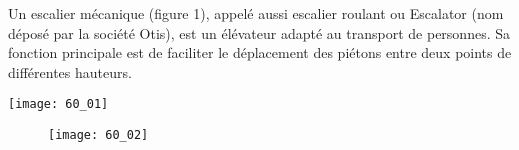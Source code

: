 \normaltrue \difficilefalse \tdifficilefalse
\correctionfalse

\setcounter{question}{0}

\ifcorrection
\else
{}
\fi

\ifprof
\else


Un escalier mécanique (figure 1), appelé aussi escalier roulant ou Escalator (nom déposé par la société Otis), est un élévateur adapté au transport de personnes. Sa fonction principale est de faciliter le déplacement des piétons entre deux points de différentes hauteurs. 



\begin{marginfigure}
\centering
\texttt{[image: 60\_01]}
\end{marginfigure}

\begin{figure}[H]
\centering
\texttt{[image: 60\_02]}

\end{figure}
\fi




\ifprof
\else


\fi